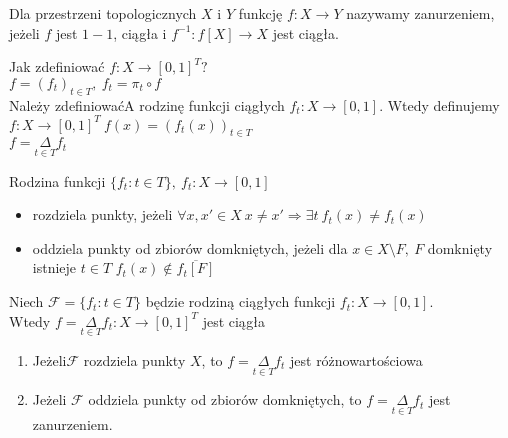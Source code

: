 \begin{df} 
    Dla przestrzeni topologicznych $X$ i $Y$ funkcję $f: X \to Y$ nazywamy zanurzeniem,
    jeżeli $f$ jest $1-1$, ciągła i $f^{-1}: f[X] \to X$ jest ciągła. 
\end{df} 
Jak zdefiniować $f: X \to [0,1]^T?$ \\ 
$f = (f_t)_{t \in T}, \ f_t = \pi_t \circ f$ \\ 
Należy zdefiniowaćA rodzinę funkcji ciągłych $f_t: X \to [0,1]$. Wtedy definujemy 
$f: X \to [0,1]^T \ f(x) = (f_t(x))_{t \in T}$ \\ 
$f = \underset{t \in T}{\Delta}f_t$
\begin{df} 
    Rodzina funkcji $\{f_t : t \in T\},\ f_t: X \to [0,1]$ 
    \begin{itemize} 
        \item rozdziela punkty, jeżeli $\forall x,x' \in X \ x \neq x' \Rightarrow 
            \exists t \ f_t (x) \neq f_t (x)$
        \item oddziela punkty od zbiorów domkniętych, jeżeli dla $x \in X \setminus F,\ F$
             domknięty istnieje $t \in T$ $f_t(x) \notin \overline{f_t[F]}$
    \end{itemize} 
\end{df} 
\begin{tw}["o przekątnej"] 
    Niech $\mathcal F = \{f_t: t \in T\}$ będzie rodziną ciągłych funkcji $f_t: X \to [0,1]$. \\ 
    Wtedy $f = \underset{t \in T}{\Delta} f_t: X \to [0,1]^T$ jest ciągła
    \begin{enumerate}[(1)]
        \item Jeżeli$\mathcal F$ rozdziela punkty $X$, to $f=\underset{t\in T}{\Delta}f_t$
                jest różnowartościowa
        \item Jeżeli $\mathcal F$ oddziela punkty od zbiorów domkniętych, to 
            $f = \underset{t \in T}{\Delta} f_t$ jest zanurzeniem. 
    \end{enumerate} 
\end{tw} 
